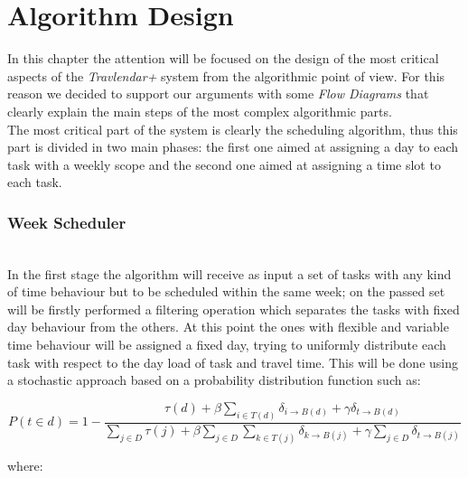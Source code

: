 \chapter{Algorithm Design}
\label{chapter:algo}
In this chapter the attention will be focused on the design of the most critical aspects of the \emph{Travlendar+} system from the algorithmic point of view. For this reason we decided to support our arguments with some \emph{Flow Diagrams} that clearly explain the main steps of the most complex algorithmic parts.
\\The most critical part of the system is clearly the scheduling algorithm, thus this part is divided in two main phases: the first one aimed at assigning a day to each task with a weekly scope and the second one aimed at assigning a time slot to each task.  

\subsection{Week Scheduler}
\\In the first stage the algorithm will receive as input a set of tasks with any kind of time behaviour but to be scheduled within the same week; on the passed set will be firstly performed a filtering operation which separates the tasks with fixed day behaviour from the others. 
At this point the ones with flexible and variable time behaviour will be assigned a fixed day, trying to uniformly distribute each task with respect to the day load of task and travel time. This will be done using a stochastic approach based on a probability distribution function such as:  

\begin{equation}
    P( t \in d) = 1 - \frac{\tau(d) + \beta \sum\limits_{i \in T(d)}{\delta_{i \rightarrow B(d)}} + \gamma \delta_{t \rightarrow B(d)}}
    {\sum\limits_{j \in D}{\tau(j)} + \beta \sum\limits_{j \in D}{\sum\limits_{k \in T(j)}{\delta_{k \rightarrow B(j)}}} + \gamma \sum\limits_{j \in D}{\delta_{t \rightarrow B(j)}}}
\end{equation}  

    \newpage
    where:
    
